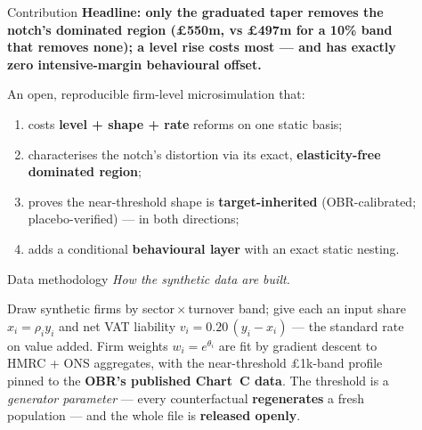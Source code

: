 \documentclass[final]{beamer}
\newlength{\sepwidth}
\newlength{\colwidth}
\newcommand{\separatorcolumn}{\begin{column}{\sepwidth}\end{column}}
\newcommand{\hl}[1]{{\color{peteal}\bfseries #1}}
\newcommand{\leadin}[1]{{\color{pedarkteal}\itshape #1}\par\vspace*{0.45em}}
\begin{document}
\begin{frame}[t]
\begin{columns}[t]
\begin{column}{\colwidth}
  \vfill

  \begin{alertblock}{Contribution}
    {\color{peteal}\bfseries Headline: only the graduated taper removes the
      notch's dominated region (\pounds550m, vs \pounds497m for a 10\% band
      that removes none); a level rise costs most --- and has exactly zero
      intensive-margin behavioural offset.}\par\vspace*{0.45em}
    An open, reproducible firm-level microsimulation that:
    \begin{enumerate}
      \item costs \hl{level + shape + rate} reforms on one static basis;
      \item characterises the notch's distortion via its exact,
            \hl{elasticity-free dominated region};
      \item proves the near-threshold shape is \hl{target-inherited}
            (OBR-calibrated; placebo-verified) --- in both directions;
      \item adds a conditional \hl{behavioural layer} with an exact
            static nesting.
    \end{enumerate}
  \end{alertblock}

  \vfill

  \begin{exampleblock}{Data methodology}
    \leadin{How the synthetic data are built.}
    Draw synthetic firms by sector\,$\times$\,turnover band; give each an
    input share $x_i=\rho_i y_i$ and net VAT liability
    $v_i=0.20\,(y_i-x_i)$ --- the standard rate on value added. Firm weights
    $w_i=e^{\theta_i}$ are fit by gradient descent to HMRC + ONS aggregates,
    with the near-threshold \pounds1k-band profile pinned to the
    \hl{OBR's published Chart~C data}. The threshold is a \emph{generator
    parameter} --- every counterfactual \hl{regenerates} a fresh
    population --- and the whole file is \hl{released openly}.
  \end{exampleblock}

  \vfill

\end{column}

\separatorcolumn

\begin{column}{\colwidth}


\end{column}
\end{columns}
\end{frame}
\end{document}
